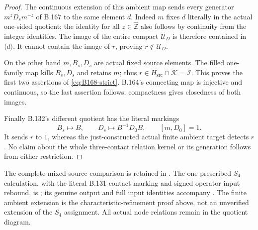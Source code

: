 \begin{proof}
The continuous extension of this ambient map sends every generator
\(m^zD_sm^{-z}\) of B.167 to the same element \(d\).
Indeed \(m\) fixes \(d\) literally in the actual one-sided quotient;
the identity for all \(z\in\widehat{\mathbb Z}\) also follows by
continuity from the integer identities.
The image of the entire compact \(\mathcal U_D\) is therefore
contained in \(\langle d\rangle\). It cannot contain the image of
\(r\), proving \(r\notin\mathcal U_D\).

On the other hand \(m,B_s,D_s\) are actual fixed source elements.
The filled one-family map kills \(B_s,D_s\) and retains \(m\);
thus \(r\in\overline{H_{\mathrm{src}}}\cap\mathcal K=\mathcal I\).
This proves the first two assertions of \eqref{eq:B168-strict}.
B.164's connecting map is injective and continuous, so the last
assertion follows; compactness gives closedness of both images.

Finally B.132's different quotient has the literal markings
\[
                 B_s\longmapsto B,\qquad
                 D_s\longmapsto B^{-1}D_0B,\qquad [m,D_0]=1.
\]
It sends \(r\) to \(1\), whereas the just-constructed actual finite
ambient target detects \(r\). No claim about the whole three-contact
relation kernel or its generation follows from either restriction.
\end{proof}

\begingroup\footnotesize\raggedright
The complete mixed-source comparison is retained in
.
The one prescribed \(S_4\) calculation, with the literal B.131
contact marking and signed operator input rebound, is
;
its genuine output and full input identities accompany
.
The finite ambient extension is the characteristic-refinement proof
above, not an unverified extension of the \(S_4\) assignment.
All actual node relations remain in the quotient diagram.
\par\endgroup
